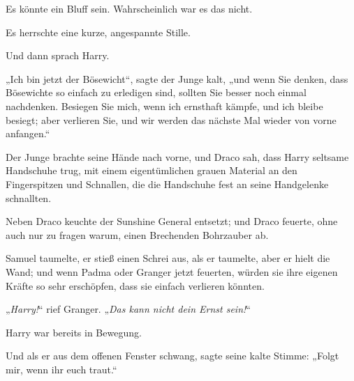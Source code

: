 Es könnte ein Bluff sein. Wahrscheinlich war es das nicht.

Es herrschte eine kurze, angespannte Stille.

Und dann sprach Harry.

„Ich bin jetzt der Bösewicht“, sagte der Junge kalt, „und wenn Sie denken, dass Bösewichte so einfach zu erledigen sind, sollten Sie besser noch einmal nachdenken. Besiegen Sie mich, wenn ich ernsthaft kämpfe, und ich bleibe besiegt; aber verlieren Sie, und wir werden das nächste Mal wieder von vorne anfangen.“

Der Junge brachte seine Hände nach vorne, und Draco sah, dass Harry seltsame Handschuhe trug, mit einem eigentümlichen grauen Material an den Fingerspitzen und Schnallen, die die Handschuhe fest an seine Handgelenke schnallten.

Neben Draco keuchte der Sunshine General entsetzt; und Draco feuerte, ohne auch nur zu fragen warum, einen Brechenden Bohrzauber ab.

Samuel taumelte, er stieß einen Schrei aus, als er taumelte, aber er hielt die Wand; und wenn Padma oder Granger jetzt feuerten, würden sie ihre eigenen Kräfte so sehr erschöpfen, dass sie einfach verlieren könnten.

„\emph{Harry!}“ rief Granger.
„\emph{Das kann nicht dein Ernst sein!}“

Harry war bereits in Bewegung.

Und als er aus dem offenen Fenster schwang, sagte seine kalte Stimme:
„Folgt mir, wenn ihr euch traut.“

